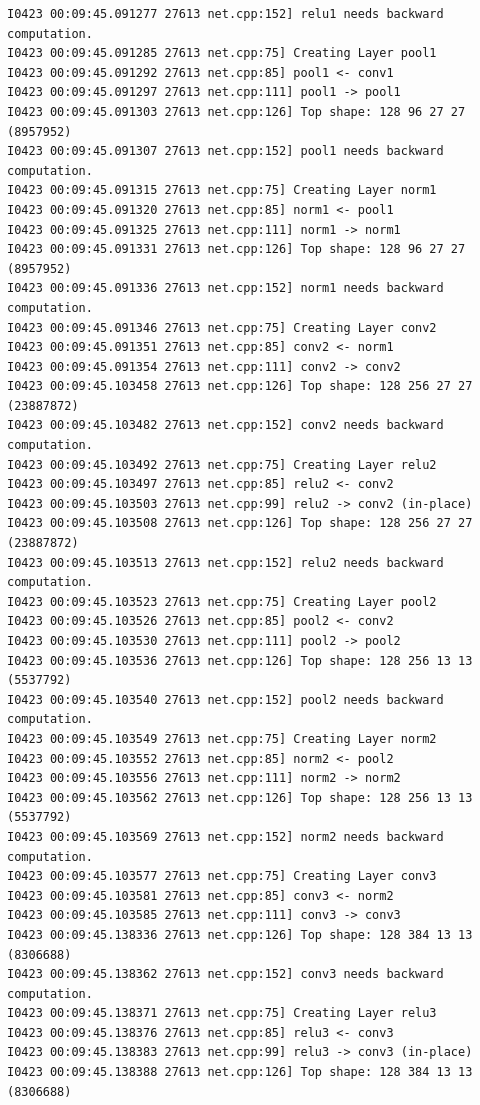 \documentclass[a4]{article}
\begin{document}
\begin{lstlisting}
I0423 00:09:45.091277 27613 net.cpp:152] relu1 needs backward computation.
I0423 00:09:45.091285 27613 net.cpp:75] Creating Layer pool1
I0423 00:09:45.091292 27613 net.cpp:85] pool1 <- conv1
I0423 00:09:45.091297 27613 net.cpp:111] pool1 -> pool1
I0423 00:09:45.091303 27613 net.cpp:126] Top shape: 128 96 27 27 (8957952)
I0423 00:09:45.091307 27613 net.cpp:152] pool1 needs backward computation.
I0423 00:09:45.091315 27613 net.cpp:75] Creating Layer norm1
I0423 00:09:45.091320 27613 net.cpp:85] norm1 <- pool1
I0423 00:09:45.091325 27613 net.cpp:111] norm1 -> norm1
I0423 00:09:45.091331 27613 net.cpp:126] Top shape: 128 96 27 27 (8957952)
I0423 00:09:45.091336 27613 net.cpp:152] norm1 needs backward computation.
I0423 00:09:45.091346 27613 net.cpp:75] Creating Layer conv2
I0423 00:09:45.091351 27613 net.cpp:85] conv2 <- norm1
I0423 00:09:45.091354 27613 net.cpp:111] conv2 -> conv2
I0423 00:09:45.103458 27613 net.cpp:126] Top shape: 128 256 27 27 (23887872)
I0423 00:09:45.103482 27613 net.cpp:152] conv2 needs backward computation.
I0423 00:09:45.103492 27613 net.cpp:75] Creating Layer relu2
I0423 00:09:45.103497 27613 net.cpp:85] relu2 <- conv2
I0423 00:09:45.103503 27613 net.cpp:99] relu2 -> conv2 (in-place)
I0423 00:09:45.103508 27613 net.cpp:126] Top shape: 128 256 27 27 (23887872)
I0423 00:09:45.103513 27613 net.cpp:152] relu2 needs backward computation.
I0423 00:09:45.103523 27613 net.cpp:75] Creating Layer pool2
I0423 00:09:45.103526 27613 net.cpp:85] pool2 <- conv2
I0423 00:09:45.103530 27613 net.cpp:111] pool2 -> pool2
I0423 00:09:45.103536 27613 net.cpp:126] Top shape: 128 256 13 13 (5537792)
I0423 00:09:45.103540 27613 net.cpp:152] pool2 needs backward computation.
I0423 00:09:45.103549 27613 net.cpp:75] Creating Layer norm2
I0423 00:09:45.103552 27613 net.cpp:85] norm2 <- pool2
I0423 00:09:45.103556 27613 net.cpp:111] norm2 -> norm2
I0423 00:09:45.103562 27613 net.cpp:126] Top shape: 128 256 13 13 (5537792)
I0423 00:09:45.103569 27613 net.cpp:152] norm2 needs backward computation.
I0423 00:09:45.103577 27613 net.cpp:75] Creating Layer conv3
I0423 00:09:45.103581 27613 net.cpp:85] conv3 <- norm2
I0423 00:09:45.103585 27613 net.cpp:111] conv3 -> conv3
I0423 00:09:45.138336 27613 net.cpp:126] Top shape: 128 384 13 13 (8306688)
I0423 00:09:45.138362 27613 net.cpp:152] conv3 needs backward computation.
I0423 00:09:45.138371 27613 net.cpp:75] Creating Layer relu3
I0423 00:09:45.138376 27613 net.cpp:85] relu3 <- conv3
I0423 00:09:45.138383 27613 net.cpp:99] relu3 -> conv3 (in-place)
I0423 00:09:45.138388 27613 net.cpp:126] Top shape: 128 384 13 13 (8306688)

\end{lstlisting}
\end{document}
